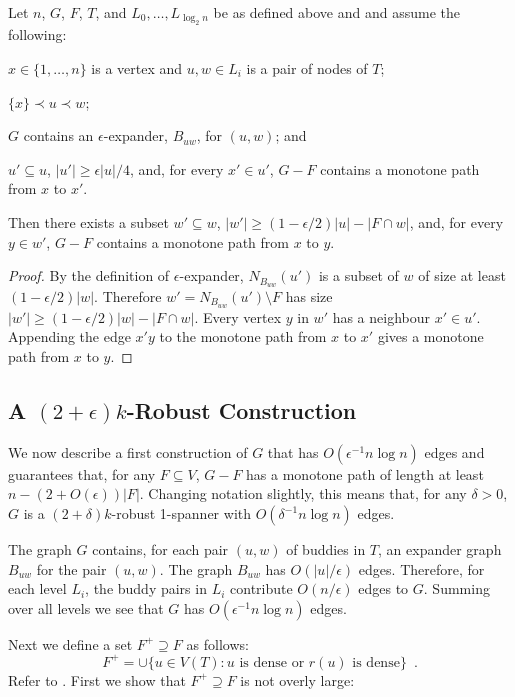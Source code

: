 \documentclass{patmorin}
\begin{document}
\begin{obs}
	Let $n$, $G$, $F$, $T$, and $L_0,\ldots,L_{\log_2 n}$ be as defined above and
  and assume the following:
  \begin{compactenum}
     \item $x\in \{1,\ldots,n\}$ is a vertex and $u,w\in L_i$ 
      is a pair of nodes of $T$;
     \item $\{x\} \prec u\prec w$;
     \item $G$ contains an $\epsilon$-expander, $B_{uw}$, for $(u,w)$; and
     \item $u'\subseteq u$, $|u'|\ge\epsilon|u|/4$, and, for every $x'\in u'$, $G-F$
   contains a monotone path from $x$ to $x'$.
   \end{compactenum}
   Then there exists a
	subset $w'\subseteq w$, $|w'|\ge(1-\epsilon/2)|u|-|F\cap w|$, and, for
   every $y\in w'$, $G-F$ contains a monotone path from $x$ to $y$.
\end{obs}

\begin{proof}
  By the definition of $\epsilon$-expander, $N_{B_{uw}}(u')$ is a
  subset of $w$ of size at least $(1-\epsilon/2)|w|$. Therefore
  $w'=N_{B_{uw}}(u')\setminus F$ has size $|w'|\ge
  (1-\epsilon/2)|w|-|F\cap w|$.  Every vertex $y$ in $w'$ has a neighbour
  $x'\in u'$. Appending the edge $x'y$ to the monotone path from $x$
  to $x'$ gives a monotone path from $x$ to $y$.
\end{proof}
   
	
\subsection{A $(2+\epsilon)k$-Robust Construction}

We now describe a first construction of $G$ that has $O(\epsilon^{-1}n\log
n)$ edges and guarantees that, for any $F\subseteq V$,  $G-F$ has a
monotone path of length at least $n-(2+O(\epsilon))|F|$.  Changing
notation slightly, this means that, for any $\delta >0$, $G$ is a
$(2+\delta)k$-robust 1-spanner with $O(\delta^{-1}n\log n)$ edges.

The graph $G$ contains, for each pair $(u,w)$ of buddies in $T$, an
expander graph $B_{uw}$ for the pair $(u,w)$.  The graph $B_{uw}$ has $O(|u|/\epsilon)$ edges. Therefore, for each level $L_i$, the buddy pairs in $L_i$ contribute $O(n/\epsilon)$ edges to $G$.  Summing over all levels we see that $G$ has $O(\epsilon^{-1}n\log n)$ edges.

Next we define a set $F^+\supseteq F$ as follows: 
\[
	F^+ = \cup\{ u\in V(T): \text{$u$ is dense or $r(u)$ is dense}\} \enspace .
\]
Refer to .
First we show that $F^+\supseteq F$ is not overly large:
\end{document}
